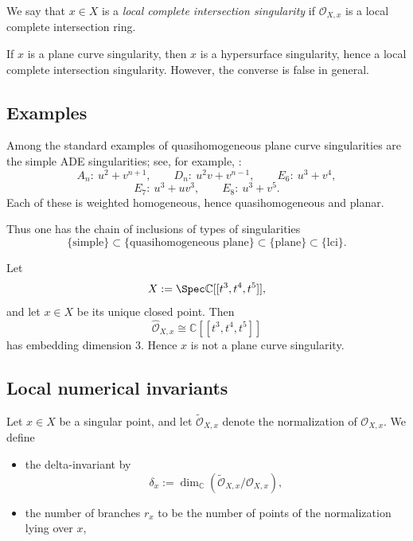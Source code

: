 \documentclass[12pt,reqno]{amsart}
\begin{document}
\begin{definition}
We say that $x\in X$ is a \emph{local complete intersection singularity} if $\mathcal O_{X,x}$ is a local complete intersection ring.
\end{definition}

\begin{remark}
If $x$ is a plane curve singularity, then $x$ is a hypersurface singularity, hence a local complete intersection singularity.
However, the converse is false in general.
\end{remark}

\subsection{Examples}

Among the standard examples of quasihomogeneous plane curve singularities are the simple ADE singularities; see, for example, \cite[\S~10]{Milnor_68}:
\[
A_n:\ u^2+v^{n+1},
\qquad
D_n:\ u^2v+v^{n-1},
\qquad
E_6:\ u^3+v^4,
\]
\[
E_7:\ u^3+uv^3,
\qquad
E_8:\ u^3+v^5.
\]
Each of these is weighted homogeneous, hence quasihomogeneous and planar.

Thus one has the chain of inclusions of types of singularities
\[
\{\text{simple}\}
\subset
\{\text{quasihomogeneous plane}\}
\subset
\{\text{plane}\}
\subset
\{\text{lci}\}.
\]

\begin{example}
Let
\[
X:=\Spec \mathbb{C}[[t^3,t^4,t^5]],
\]
and let \(x\in X\) be its unique closed point. Then
\[
\widehat{\mathcal O}_{X,x}\cong \mathbb{C}[[t^3,t^4,t^5]]
\]
has embedding dimension \(3\). Hence \(x\) is not a plane curve singularity.
\end{example}

\subsection{Local numerical invariants}

Let \(x\in X\) be a singular point, and let \(\widetilde{\mathcal O}_{X,x}\) denote the normalization of \(\mathcal O_{X,x}\). We define

\begin{itemize}
  \item the delta-invariant by
    \[
    \delta_x:=\dim_{\mathbb{C}}\!\left(\widetilde{\mathcal O}_{X,x}/\mathcal O_{X,x}\right),
    \]
  \item the number of branches \(r_x\) to be the number of points of the normalization lying over \(x\),
\end{itemize}
\end{document}

